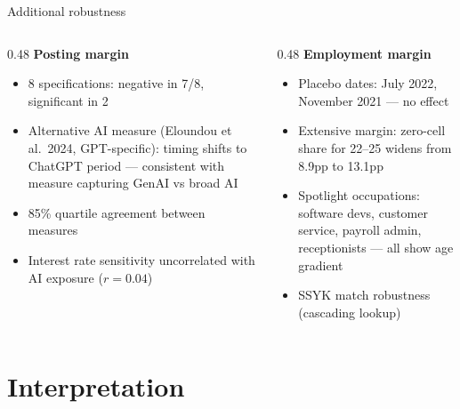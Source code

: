 \documentclass[aspectratio=169,11pt]{beamer}
\begin{document}
\begin{frame}{Additional robustness}
\begin{columns}[T]
\begin{column}{0.48\textwidth}
\textbf{Posting margin}
\begin{itemize}
    \item 8 specifications: negative in 7/8, significant in 2
    \item Alternative AI measure (Eloundou et al.\ 2024, GPT-specific): timing shifts to ChatGPT period --- consistent with measure capturing GenAI vs broad AI
    \item 85\% quartile agreement between measures
    \item Interest rate sensitivity uncorrelated with AI exposure ($r = 0.04$)
\end{itemize}
\end{column}
\begin{column}{0.48\textwidth}
\textbf{Employment margin}
\begin{itemize}
    \item Placebo dates: July 2022, November 2021 --- no effect
    \item Extensive margin: zero-cell share for 22--25 widens from 8.9pp to 13.1pp {\tiny\hyperlink{backup:extensive}{}}
    \item Spotlight occupations: software devs, customer service, payroll admin, receptionists --- all show age gradient
    \item SSYK match robustness (cascading lookup)
\end{itemize}
\end{column}
\end{columns}
\end{frame}

\section{Interpretation}
\end{document}
